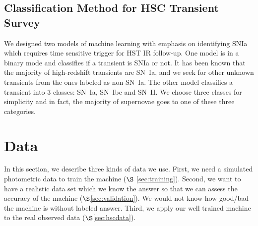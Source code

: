 \documentclass[useamsfonts]{pasj01}
\begin{document}
\subsection{Classification Method for HSC Transient Survey}
We designed two models of machine learning with emphasis on identifying SNIa which requires time sensitive trigger for HST IR follow-up.  One model is in a binary mode and classifies if a transient is SNIa or not.
It has been known that the majority of high-redshift transients are SN~Ia, and we seek for other unknown transients
from the ones labeled as non-SN~Ia.   
The other model classifies a transient into 3 classes: SN~Ia, SN~Ibc and SN~II.  
We choose three classes for simplicity and in fact, the majority of supernovae goes to one of these three categories.
%
%
%
%
%
%
\section{Data}
In this section, we describe three kinds of data we use.
First, we need a simulated photometric data to train the machine ($\S$ \ref{sec:training}).
Second, we want to have a realistic data set which we know the answer so that we can assess the
accuracy of the machine ($\S$\ref{sec:validation}).  We would not know how good/bad the machine 
is without labeled answer.
Third, we apply our well trained machine to the real observed data ($\S$\ref{sec:hscdata}).

\end{document}
